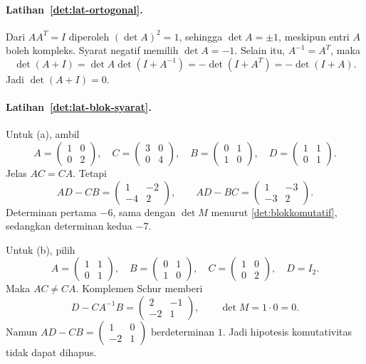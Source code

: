       \paragraph{Latihan~\ref{det:lat-ortogonal}.}
      Dari $AA^T=I$ diperoleh $(\det A)^2=1$, sehingga $\det A=\pm1$,
      meskipun entri $A$ boleh kompleks. Syarat negatif memilih $\det A=-1$.
      Selain itu, $A^{-1}=A^T$, maka
      \[
            \det(A+I)=\det A\det(I+A^{-1})
            =-\det(I+A^T)=-\det(I+A).
      \]
      Jadi $\det(A+I)=0$.

      \paragraph{Latihan~\ref{det:lat-blok-syarat}.}
      Untuk (a), ambil
      \[
            A=\begin{pmatrix}1&0\\0&2\end{pmatrix},\quad
            C=\begin{pmatrix}3&0\\0&4\end{pmatrix},\quad
            B=\begin{pmatrix}0&1\\1&0\end{pmatrix},\quad
            D=\begin{pmatrix}1&1\\0&1\end{pmatrix}.
      \]
      Jelas $AC=CA$. Tetapi
      \[
            AD-CB=\begin{pmatrix}1&-2\\-4&2\end{pmatrix},\qquad
            AD-BC=\begin{pmatrix}1&-3\\-3&2\end{pmatrix}.
      \]
      Determinan pertama $-6$, sama dengan $\det M$ menurut
      \autoref{det:blokkomutatif}, sedangkan determinan kedua $-7$.

      Untuk (b), pilih
      \[
            A=\begin{pmatrix}1&1\\0&1\end{pmatrix},\quad
            B=\begin{pmatrix}0&1\\1&0\end{pmatrix},\quad
            C=\begin{pmatrix}1&0\\0&2\end{pmatrix},\quad D=I_2.
      \]
      Maka $AC\ne CA$. Komplemen Schur memberi
      \[
            D-CA^{-1}B=\begin{pmatrix}2&-1\\-2&1\end{pmatrix},
            \qquad \det M=1\cdot0=0.
      \]
      Namun $AD-CB=\left(\begin{smallmatrix}1&0\\-2&1\end{smallmatrix}\right)$
      berdeterminan $1$. Jadi hipotesis komutativitas tidak dapat dihapus.


